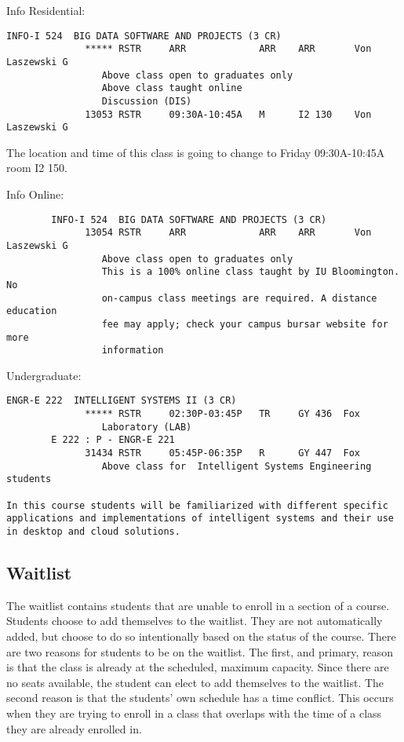 \begin{itemize}
Info Residential:

\begin{verbatim}
INFO-I 524  BIG DATA SOFTWARE AND PROJECTS (3 CR) 
              ***** RSTR     ARR             ARR    ARR       Von Laszewski G          
                 Above class open to graduates only
                 Above class taught online
                 Discussion (DIS)
              13053 RSTR     09:30A-10:45A   M      I2 130    Von Laszewski G  
\end{verbatim}

\begin{NOTE}
The location and time of this class is going to change to Friday
09:30A-10:45A   room I2 150.  
\end{NOTE}

Info Online:

\begin{verbatim}        
        INFO-I 524  BIG DATA SOFTWARE AND PROJECTS (3 CR)
              13054 RSTR     ARR             ARR    ARR       Von Laszewski G          
                 Above class open to graduates only
                 This is a 100% online class taught by IU Bloomington. No
                 on-campus class meetings are required. A distance education
                 fee may apply; check your campus bursar website for more
                 information
\end{verbatim}

Undergraduate:

\begin{verbatim}
ENGR-E 222  INTELLIGENT SYSTEMS II (3 CR)
              ***** RSTR     02:30P-03:45P   TR     GY 436  Fox
                 Laboratory (LAB)
        E 222 : P - ENGR-E 221
              31434 RSTR     05:45P-06:35P   R      GY 447  Fox
                 Above class for  Intelligent Systems Engineering students

In this course students will be familiarized with different specific 
applications and implementations of intelligent systems and their use 
in desktop and cloud solutions.
\end{verbatim}        



\subsection{Waitlist}\label{waitlist}

The waitlist contains students that are unable to enroll in a section of
a course. Students choose to add themselves to the waitlist. They are
not automatically added, but choose to do so intentionally based on the
status of the course. There are two reasons for students to be on the
waitlist. The first, and primary, reason is that the class is already at
the scheduled, maximum capacity. Since there are no seats available, the
student can elect to add themselves to the waitlist. The second reason
is that the students' own schedule has a time conflict. This occurs when
they are trying to enroll in a class that overlaps with the time of a
class they are already enrolled in.


\end{itemize}
